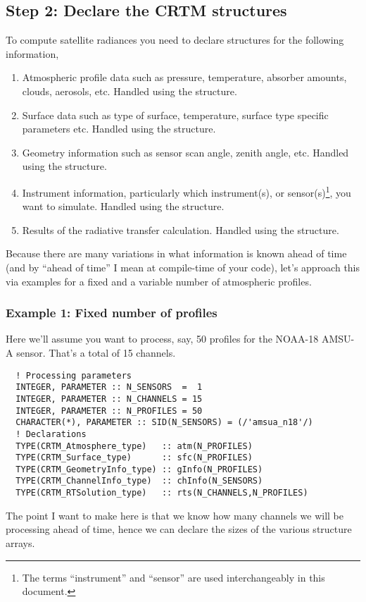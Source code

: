 \subsection{Step 2: Declare the CRTM structures}
\label{sec:declare_step}
To compute satellite radiances you need to declare structures for the following information,
\begin{enumerate}
  \item Atmospheric profile data such as pressure, temperature, absorber amounts, clouds, aerosols, etc. Handled using the \Atmosphere{} structure.
  \item Surface data such as type of surface, temperature, surface type specific parameters etc. Handled using the \Surface{} structure.
  \item Geometry information such as sensor scan angle, zenith angle, etc. Handled using the \GeometryInfo{} structure.
  \item Instrument information, particularly which instrument(s), or sensor(s)\footnote{The terms ``instrument'' and ``sensor'' are used interchangeably in this document.}, you want to simulate. Handled using the \ChannelInfo{} structure.
  \item Results of the radiative transfer calculation. Handled using the \RTSolution{} structure.
\end{enumerate}
Because there are many variations in what information is known ahead of time (and by ``ahead of time'' I mean at compile-time of your code), let's approach this via examples for a fixed and a variable number of atmospheric profiles.

\subsubsection{Example 1: Fixed number of profiles}
\label{sec:declare_step_allfixed_ex}
Here we'll assume you want to process, say, 50 profiles for the NOAA-18 AMSU-A sensor. That's a total of 15 channels.
\begin{ttfamily}
  \begin{verbatim}
  ! Processing parameters
  INTEGER, PARAMETER :: N_SENSORS  =  1
  INTEGER, PARAMETER :: N_CHANNELS = 15
  INTEGER, PARAMETER :: N_PROFILES = 50
  CHARACTER(*), PARAMETER :: SID(N_SENSORS) = (/'amsua_n18'/)
  ! Declarations
  TYPE(CRTM_Atmosphere_type)   :: atm(N_PROFILES)
  TYPE(CRTM_Surface_type)      :: sfc(N_PROFILES)
  TYPE(CRTM_GeometryInfo_type) :: gInfo(N_PROFILES)  
  TYPE(CRTM_ChannelInfo_type)  :: chInfo(N_SENSORS)  
  TYPE(CRTM_RTSolution_type)   :: rts(N_CHANNELS,N_PROFILES)\end{verbatim}
\end{ttfamily}
The point I want to make here is that we know how many channels we will be processing ahead of time, hence we can declare the sizes of the various structure arrays.

